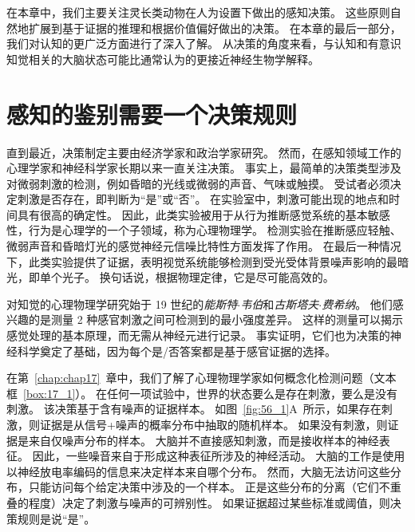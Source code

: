 在本章中，我们主要关注灵长类动物在人为设置下做出的感知决策。
这些原则自然地扩展到基于证据的推理和根据价值偏好做出的决策。
在本章的最后一部分，我们对认知的更广泛方面进行了深入了解。
从决策的角度来看，与认知和有意识知觉相关的大脑状态可能比通常认为的更接近神经生物学解释。



\section{感知的鉴别需要一个决策规则}

直到最近，决策制定主要由经济学家和政治学家研究。
然而，在感知领域工作的心理学家和神经科学家长期以来一直关注决策。
事实上，最简单的决策类型涉及对微弱刺激的检测，例如昏暗的光线或微弱的声音、气味或触摸。
受试者必须决定刺激是否存在，即判断为“是”或“否”。
在实验室中，刺激可能出现的地点和时间具有很高的确定性。
因此，此类实验被用于从行为推断感觉系统的基本敏感性，行为是心理学的一个子领域，称为心理物理学。
检测实验在推断感应轻触、微弱声音和昏暗灯光的感觉神经元信噪比特性方面发挥了作用。
在最后一种情况下，此类实验提供了证据，表明视觉系统能够检测到受光受体背景噪声影响的最暗光，即单个光子。
换句话说，根据物理定律，它是尽可能高效的。


对知觉的心理物理学研究始于 19 世纪的\textit{能斯特$\cdot$韦伯}和\textit{古斯塔夫$\cdot$费希纳}。
他们感兴趣的是测量 2 种感官刺激之间可检测到的最小强度差异。
这样的测量可以揭示感觉处理的基本原理，而无需从神经元进行记录。
事实证明，它们也为决策的神经科学奠定了基础，因为每个是/否答案都是基于感官证据的选择。


在第~\ref{chap:chap17}~章中，我们了解了心理物理学家如何概念化检测问题（文本框~\ref{box:17_1}）。
在任何一项试验中，世界的状态要么是存在刺激，要么是没有刺激。
该决策基于含有噪声的证据样本。
如图~\ref{fig:56_1}A~所示，如果存在刺激，则证据是从信号+噪声的概率分布中抽取的随机样本。
如果没有刺激，则证据是来自仅噪声分布的样本。
大脑并不直接感知刺激，而是接收样本的神经表征。
因此，一些噪音来自于形成这种表征所涉及的神经活动。
大脑的工作是使用以神经放电率编码的信息来决定样本来自哪个分布。
然而，大脑无法访问这些分布，只能访问每个给定决策中涉及的一个样本。
正是这些分布的分离（它们不重叠的程度）决定了刺激与噪声的可辨别性。
如果证据超过某些标准或阈值，则决策规则是说“是”。


